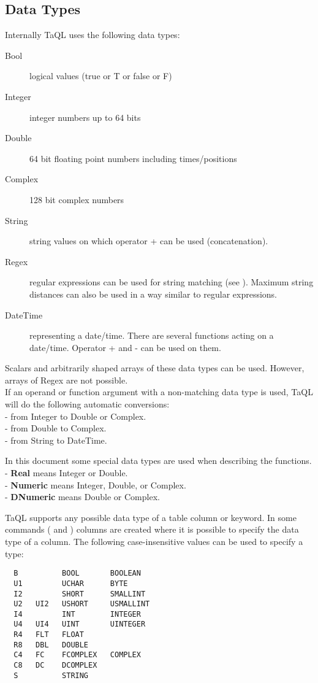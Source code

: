 \subsection{\label{TAQL:DATATYPES}Data Types}
Internally TaQL uses the following data types:
\begin{description}
  \item[Bool ] logical values (true or T or false or F)
  \item[Integer ] integer numbers up to 64 bits
  \item[Double ] 64 bit floating point numbers including times/positions
  \item[Complex ] 128 bit complex numbers
  \item[String ] string values on which operator + can be used (concatenation).
  \item[Regex ] regular expressions can be used for string
    matching (see ). Maximum string
    distances can also be used in a way similar to regular
    expressions. 
  \item[DateTime ] representing a date/time. There are several functions
       acting on a date/time. Operator + and - can be used on them.
\end{description}
Scalars and arbitrarily shaped arrays of these data types can be used.
However, arrays of Regex are not possible.
\\If an operand or function argument with a non-matching data type
is used, TaQL will do the following automatic conversions:
\\- from Integer to Double or Complex.
\\- from Double to Complex.
\\- from String to DateTime.

In this document some special data types are used when describing the functions.
\\- \textbf{Real} means Integer or Double.
\\- \textbf{Numeric} means Integer, Double, or Complex.
\\- \textbf{DNumeric} means Double or Complex.

\label{TAQL:DATATYPESTRING}
TaQL supports any possible data type of a table column or keyword.
In some commands ( and
) columns are created where
it is possible to specify the data type of a column. 
The following case-insensitive values can be used to specify a type:
\begin{verbatim}
  B          BOOL       BOOLEAN
  U1         UCHAR      BYTE
  I2         SHORT      SMALLINT
  U2   UI2   USHORT     USMALLINT
  I4         INT        INTEGER
  U4   UI4   UINT       UINTEGER
  R4   FLT   FLOAT
  R8   DBL   DOUBLE
  C4   FC    FCOMPLEX   COMPLEX
  C8   DC    DCOMPLEX
  S          STRING
\end{verbatim}

